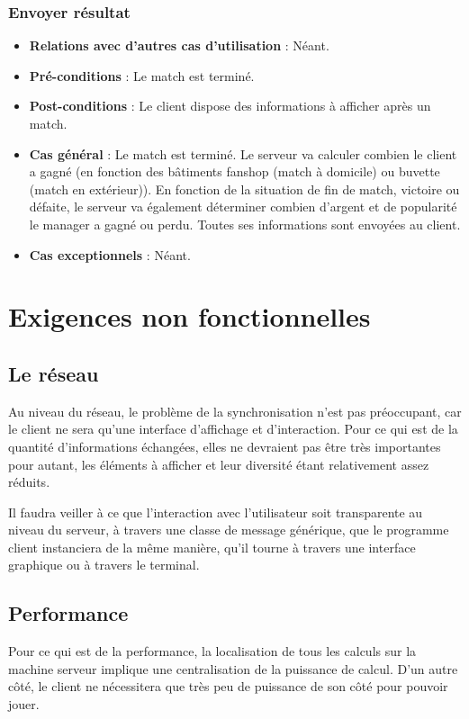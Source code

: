 \documentclass[a4paper,titlepage]{scrreprt}
\begin{document}
    \subsubsection{Envoyer résultat}
      \begin{itemize}
        \item \textbf{Relations avec d'autres cas d'utilisation}  : Néant.
        \item \textbf{Pré-conditions} : Le match est terminé.
        \item \textbf{Post-conditions} : Le client dispose des informations à afficher après un match.
        \item \textbf{Cas général} : Le match est terminé. Le serveur va calculer combien le client a gagné (en fonction des bâtiments \gls{fanshop} (match à domicile) ou \gls{buvette} (match en extérieur)). En fonction de la situation de fin de match, victoire ou défaite, le serveur va également déterminer combien d’argent et de popularité le manager a gagné ou perdu. Toutes ses informations sont envoyées au client.
        \item \textbf{Cas exceptionnels} : Néant.
      \end{itemize}




\section{Exigences non fonctionnelles}
  \subsection{Le réseau}
  Au niveau du réseau, le problème de la synchronisation n'est pas préoccupant, 
  car le client ne sera qu'une interface d'affichage et d'interaction. 
  Pour ce qui est de la quantité d'informations échangées, 
  elles ne devraient pas être très importantes pour autant, 
  les éléments à afficher et leur diversité étant relativement assez réduits.
  
  Il faudra veiller à ce que l'interaction avec l'utilisateur soit transparente 
  au niveau du serveur, à travers une classe de message générique, 
  que le programme client instanciera de la même manière, 
  qu'il tourne à travers une interface graphique ou à travers le terminal.
  \subsection{Performance}
  Pour ce qui est de la performance, la localisation de tous les calculs sur la machine serveur 
  implique une centralisation de la puissance de calcul. 
  D'un autre côté, le client ne nécessitera que très peu de puissance de son côté pour pouvoir jouer.
\end{document}
